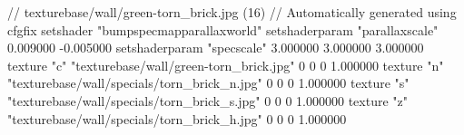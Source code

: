 // texturebase/wall/green-torn_brick.jpg (16)
// Automatically generated using cfgfix
setshader "bumpspecmapparallaxworld"
setshaderparam "parallaxscale" 0.009000 -0.005000
setshaderparam "specscale" 3.000000 3.000000 3.000000
texture "c" "texturebase/wall/green-torn_brick.jpg" 0 0 0 1.000000
texture "n" "texturebase/wall/specials/torn_brick_n.jpg" 0 0 0 1.000000
texture "s" "texturebase/wall/specials/torn_brick_s.jpg" 0 0 0 1.000000
texture "z" "texturebase/wall/specials/torn_brick_h.jpg" 0 0 0 1.000000
